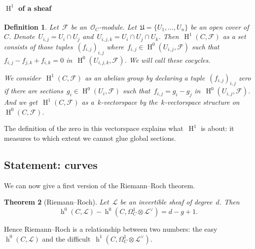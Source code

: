 \documentclass[10pt,a4paper]{article}
\theoremstyle{lecture}
\newtheorem{theorem}{Theorem}
\newtheorem{definition}[theorem]{Definition}
\newcommand\dash{\nobreakdash-\hspace{0pt}}
\DeclareMathOperator\hh{h}
\DeclareMathOperator\HH{H}
\begin{document}
\paragraph{$\HH^1$ of a sheaf}
\begin{definition}
  Let~$\mathcal{F}$ be an~$\mathcal{O}_C$\dash module. Let~$\mathfrak{U}=\{U_1,\dotsc,U_n\}$ be an open cover of~$C$. Denote~$U_{i,j}=U_i\cap U_j$ and~$U_{i,j,k}=U_i\cap U_j\cap U_k$. Then~$\HH^1(C,\mathcal{F})$ \emph{as a set} consists of those tuples~$(f_{i,j})_{i,j}$ where~$f_{i,j}\in\HH^0(U_{i,j},\mathcal{F})$ such that~$f_{i,j}-f_{j,k}+f_{i,k}=0$ in~$\HH^0(U_{i,j,k},\mathcal{F})$. We will call these \emph{cocycles}.

  We consider~$\HH^1(C,\mathcal{F})$ \emph{as an abelian group} by declaring a tuple~$(f_{i,j})_{i,j}$ zero if there are sections~$g_i\in\HH^0(U_i,\mathcal{F})$ such that~$f_{i,j}=g_i-g_j$ in~$\HH^0(U_{i,j},\mathcal{F})$. And we get~$\HH^1(C,\mathcal{F})$ \emph{as a~$k$\dash vectorspace} by the~$k$\dash vectorspace structure on~$\HH^0(C,\mathcal{F})$.
\end{definition}
The definition of the zero in this vectorspace explains what~$\HH^1$ is about: it measures to which extent we cannot glue global sections.

\subsection{Statement: curves}
\label{subsection:statement-curves}
We can now give a first version of the Riemann--Roch theorem.
\begin{theorem}[Riemann--Roch]
  \label{theorem:riemann-roch}
  Let~$\mathcal{L}$ be an invertible sheaf of degree~$d$. Then
  \begin{equation}
    \hh^0(C,\mathcal{L})-\hh^0(C,\Omega_C^1\otimes\mathcal{L}^\vee)=d-g+1.
  \end{equation}
\end{theorem}
Hence Riemann--Roch is a relationship between two numbers: the easy~$\hh^0(C,\mathcal{L})$ and the difficult~$\hh^1(C,\Omega_C^1\otimes\mathcal{L}^\vee)$.
\end{document}
